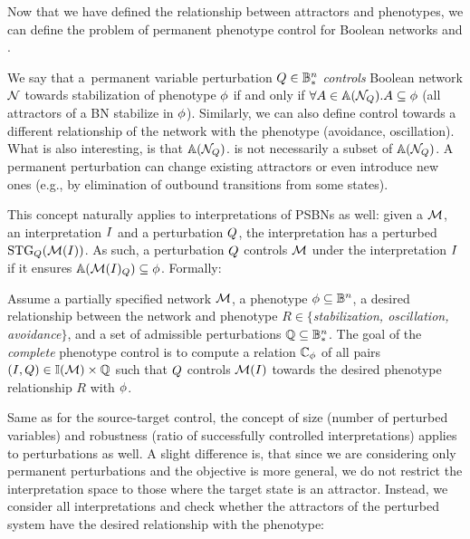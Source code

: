 Now that we have defined the relationship between attractors and phenotypes, we can define the problem of permanent phenotype control for Boolean networks and .

We say that a~permanent variable perturbation $Q \in \mathbb{B}_{{*}}^n$ \emph{controls} Boolean network $\mathcal{N}$ towards stabilization of phenotype $\phi$ if and only if $\forall A \in \mathbb{A}(\mathcal{N}_{Q}) . A \subseteq \phi$ (all attractors of a BN stabilize in $\phi$). Similarly, we can also define control towards a different relationship of the network with the phenotype (avoidance, oscillation). What is also interesting, is that $\mathbb{A}(\mathcal{N}_{Q})$. is not necessarily a subset of $\mathbb{A}(\mathcal{N}_{Q})$. A permanent perturbation can change existing attractors or even introduce new ones (e.g., by elimination of outbound transitions from some states).

This concept naturally applies to interpretations of PSBNs as well: given a $\mathcal{M}$, an interpretation $I$ and a perturbation $Q$, the interpretation has a perturbed $\text{\upshape STG}_{Q}(\mathcal{M}(I))$. As such, a perturbation $Q$ controls $\mathcal{M}$ under the interpretation $I$ if it ensures $\mathbb{A}(\mathcal{M}(I)_{Q}) \subseteq \phi$. Formally:

\begin{definition}
	Assume a partially specified network $\mathcal{M}$, a phenotype $\phi \subseteq \mathbb{B}^n$, a desired relationship between the network and phenotype $R \in \{$\emph{stabilization, oscillation, avoidance}$\}$, and a set of admissible perturbations $\mathbb{Q} \subseteq \mathbb{B}_{{*}}^n$. The goal of the \emph{complete} phenotype control is to compute a relation $\mathbb{C}_{\phi}$ of all pairs $(I, Q) \in \mathbb{I}(\mathcal{M}) \times \mathbb{Q}$ such that $Q$ controls $\mathcal{M}(I)$ towards the desired phenotype relationship $R$ with $\phi$.
  \label{def:complete_phenotype_control}
\end{definition}

Same as for the source-target control, the concept of size (number of perturbed variables) and robustness (ratio of successfully controlled interpretations) applies to perturbations as well. A slight difference is, that since we are considering only permanent perturbations and the objective is more general, we do not restrict the interpretation space to those where the target state is an attractor. Instead, we consider all interpretations and check whether the attractors of the perturbed system have the desired relationship with the phenotype:

